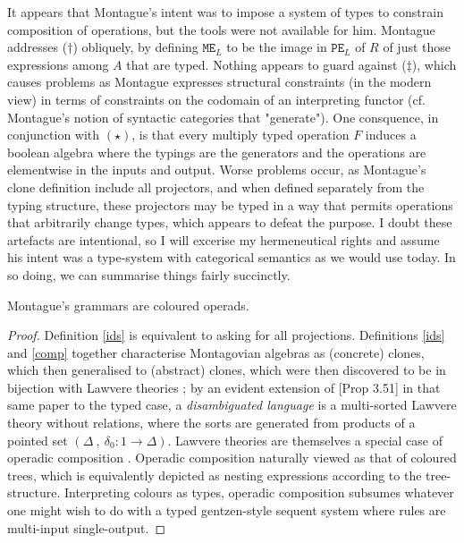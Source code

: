 It appears that Montague's intent was to impose a system of types to constrain composition of operations, but the tools were not available for him. Montague addresses ($\dag$) obliquely, by defining $\texttt{ME}_L$ to be the image in $\texttt{PE}_L$ of $R$ of just those expressions among $A$ that are typed. Nothing appears to guard against ($\ddag$), which causes problems as Montague expresses structural constraints (in the modern view) in terms of constraints on the codomain of an interpreting functor (cf. Montague's notion of syntactic categories that "generate"). One consquence, in conjunction with $(\star)$, is that every multiply typed operation $F$ induces a boolean algebra where the typings are the generators and the operations are elementwise in the inputs and output. Worse problems occur, as Montague's clone definition include all projectors, and when defined separately from the typing structure, these projectors may be typed in a way that permits operations that arbitrarily change types, which appears to defeat the purpose. I doubt these artefacts are intentional, so I will excerise my hermeneutical rights and assume his intent was a type-system with categorical semantics as we would use today. In so doing, we can summarise things fairly succinctly.

\begin{proposition}
Montague's grammars are coloured operads.
\begin{proof}
Definition \ref{ids} is equivalent to asking for all projections. Definitions \ref{ids} and \ref{comp} together characterise Montagovian algebras as (concrete) clones, which then generalised to (abstract) clones, which were then discovered to be in bijection with Lawvere theories \citep{kerkhoffShortIntroductionClones2014a}; by an evident extension of [Prop 3.51] in that same paper to the typed case, a \emph{disambiguated language} is a multi-sorted Lawvere theory without relations, where the sorts are generated from products of a pointed set $(\Delta\ , \ \delta_0 : 1 \rightarrow \Delta)$. Lawvere theories are themselves a special case of operadic composition \citep{yauColoredOperads2016}. Operadic composition naturally viewed as that of coloured trees, which is equivalently depicted as nesting expressions according to the tree-structure. Interpreting colours as types, operadic composition subsumes whatever one might wish to do with a typed gentzen-style sequent system where rules are multi-input single-output.
\end{proof}
\end{proposition}

